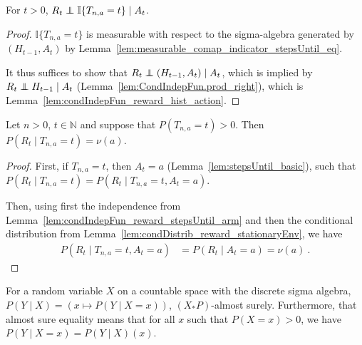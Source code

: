 \begin{lemma}\label{lem:condIndepFun_reward_stepsUntil_arm}
  \leanok
For $t > 0$, $R_t \perp\!\!\!\!\perp \mathbb{I}\{T_{n, a} = t\} \mid A_t$.
\end{lemma}

\begin{proof}\leanok
$\mathbb{I}\{T_{n, a} = t\}$ is measurable with respect to the sigma-algebra generated by $(H_{t-1}, A_t)$ by Lemma~\ref{lem:measurable_comap_indicator_stepsUntil_eq}.

It thus suffices to show that $R_t \perp\!\!\!\!\perp (H_{t-1}, A_t) \mid A_t$, which is implied by $R_t \perp\!\!\!\!\perp H_{t-1} \mid A_t$ (Lemma~\ref{lem:CondIndepFun.prod_right}), which is Lemma~\ref{lem:condIndepFun_reward_hist_action}.
\end{proof}


\begin{lemma}\label{lem:reward_cond_stepsUntil}
  \leanok
Let $n > 0$, $t \in \mathbb{N}$ and suppose that $P(T_{n, a} = t) > 0$.
Then $P(R_t \mid T_{n, a} = t) = \nu(a)$.
\end{lemma}

\begin{proof}\leanok
First, if $T_{n, a} = t$, then $A_t = a$ (Lemma~\ref{lem:stepsUntil_basic}), such that $P(R_t \mid T_{n, a} = t) = P(R_t \mid T_{n, a} = t, A_t = a)$.

Then, using first the independence from Lemma~\ref{lem:condIndepFun_reward_stepsUntil_arm} and then the conditional distribution from Lemma~\ref{lem:condDistrib_reward_stationaryEnv}, we have
\begin{align*}
  P(R_t \mid T_{n, a} = t, A_t = a)
  &= P(R_t \mid A_t = a)
  = \nu(a)
  \: .
\end{align*}
\end{proof}


\begin{lemma}\label{lem:condDistrib_ae_eq_cond}
  \leanok
For a random variable $X$ on a countable space with the discrete sigma algebra, $P(Y \mid X) = (x \mapsto P(Y \mid X = x))$, $(X_*P)$-almost surely.
Furthermore, that almost sure equality means that for all $x$ such that $P(X = x) > 0$, we have $P(Y \mid X = x) = P(Y \mid X)(x)$.
\end{lemma}

